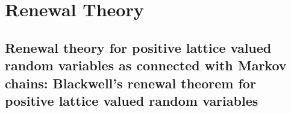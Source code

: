 \chapter{Renewal Theory}   
\section{Renewal theory for positive lattice valued random variables as connected with Markov chains: Blackwell's renewal theorem for positive lattice valued random variables}